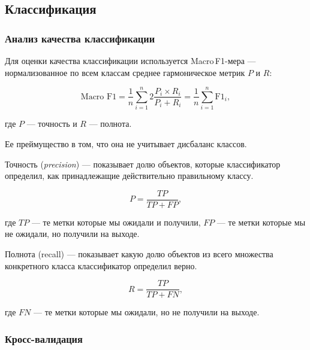 \subsection{Классификация}
\vspace{-1.3cm}

\subsubsection{Анализ качества классификации}

Для оценки качества классификации используется Macro\,F1-мера --- нормализованное по всем классам среднее гармоническое метрик $P$ и $R$:

    \begin{equation*}
    \text{Macro F1} =  \frac{1}{n}\sum_{i=1}^n 2\frac{P_i\times R_i}{P_i + R_i} = \frac{1}{n}\sum_{i=1}^n
\text{F1}_i,
    \end{equation*}

где $P$ --- точность и $R$ --- полнота.

\bigskip\noindent
Ее преймущество в том, что она не учитывает дисбаланс классов.

\begin{definition}
 Точность (\textit{precision}) --- показывает долю объектов, которые классификатор определил, как принадлежащие действительно правильному классу.
\end{definition}

\begin{equation*}
 P = \frac{TP}{TP + FP},
\end{equation*}

\bigskip
где $TP$ --- те метки которые мы ожидали и получили, $FP$ --- те метки которые мы не ожидали, но получили на выходе.

\begin{definition}
 Полнота (recall) --- показывает какую долю объектов из всего множества конкретного класса классификатор определил верно.
\end{definition}

\begin{equation*}
 R = \frac{TP}{TP + FN},
\end{equation*}

\bigskip
где $FN$ --- те метки которые мы ожидали, но не получили на выходе.




\subsubsection{Кросс-валидация}

